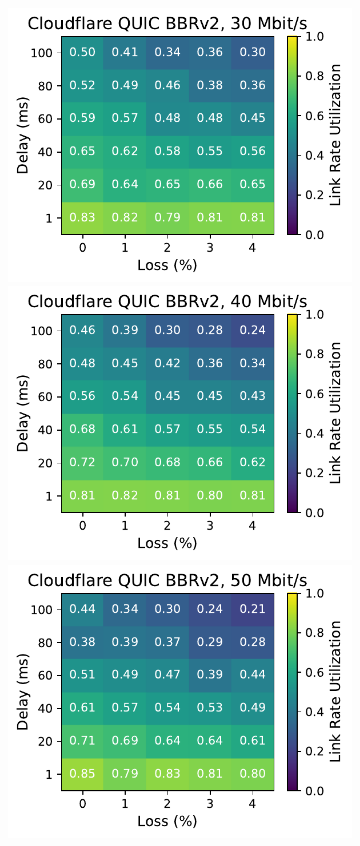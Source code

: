 \begin{figure}[ht]
\begin{subfigure}[b]{0.22\linewidth}
        \includegraphics[width=\linewidth,trim={0 0 2cm 0},clip]{figures/heatmaps/heatmap_quiche_bbr2_30mbps.pdf}
        \includegraphics[width=\linewidth,trim={0 0 2cm 0},clip]{figures/heatmaps/heatmap_quiche_bbr2_40mbps.pdf}
        \includegraphics[width=\linewidth,trim={0 0 2cm 0},clip]{figures/heatmaps/heatmap_quiche_bbr2_50mbps.pdf}

\end{subfigure}
\end{figure}
